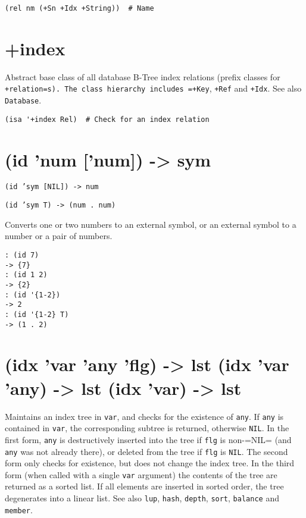 {{{{{{\begin{verbatim}
(rel nm (+Sn +Idx +String))  # Name
\end{verbatim}

 
\section{+index}
\label{sec-8-1-9-2}


Abstract base class of all database B-Tree index relations (prefix
classes for \texttt{+relation=s). The class hierarchy includes =+Key}, \texttt{+Ref}
and \texttt{+Idx}. See also \texttt{Database}.


\begin{verbatim}
(isa '+index Rel)  # Check for an index relation
\end{verbatim}

 
\section{(id 'num ['num]) -> sym}
\label{sec-8-1-9-3}


\texttt{(id 'sym [NIL]) -> num}

\texttt{(id 'sym T) -> (num . num)}

Converts one or two numbers to an external symbol, or an external symbol
to a number or a pair of numbers.


\begin{verbatim}
: (id 7)
-> {7}
: (id 1 2)
-> {2}
: (id '{1-2})
-> 2
: (id '{1-2} T)
-> (1 . 2)
\end{verbatim}

 
\section{(idx 'var 'any 'flg) -> lst (idx 'var 'any) -> lst (idx 'var) -> lst}
\label{sec-8-1-9-4}


Maintains an index tree in \texttt{var}, and checks for the existence of \texttt{any}.
If \texttt{any} is contained in \texttt{var}, the corresponding subtree is returned,
otherwise \texttt{NIL}. In the first form, \texttt{any} is destructively inserted into
the tree if \texttt{flg} is non-=NIL= (and \texttt{any} was not already there), or
deleted from the tree if \texttt{flg} is \texttt{NIL}. The second form only checks for
existence, but does not change the index tree. In the third form (when
called with a single \texttt{var} argument) the contents of the tree are
returned as a sorted list. If all elements are inserted in sorted order,
the tree degenerates into a linear list. See also \texttt{lup}, \texttt{hash},
\texttt{depth}, \texttt{sort}, \texttt{balance} and \texttt{member}.


}}}}}}
